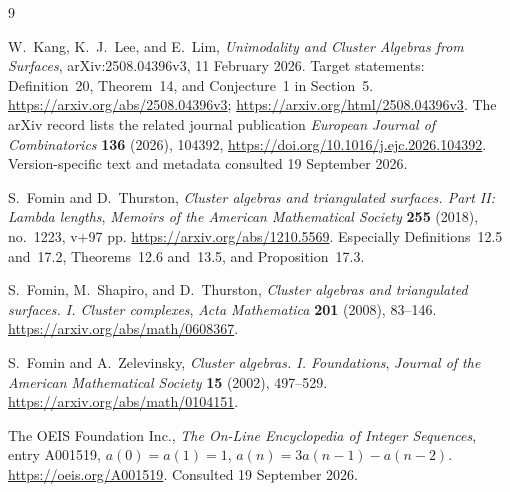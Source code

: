 \documentclass[11pt,letterpaper]{article}
\numberwithin{equation}{section}
\theoremstyle{definition}
\begin{document}
\begin{thebibliography}{9}

W.~Kang, K.~J.~Lee, and E.~Lim,
\emph{Unimodality and Cluster Algebras from Surfaces},
arXiv:2508.04396v3, 11 February 2026.
Target statements: Definition~20, Theorem~14, and Conjecture~1 in Section~5.
\url{https://arxiv.org/abs/2508.04396v3};
\url{https://arxiv.org/html/2508.04396v3}.
The arXiv record lists the related journal publication
\emph{European Journal of Combinatorics} \textbf{136} (2026), 104392,
\url{https://doi.org/10.1016/j.ejc.2026.104392}.
Version-specific text and metadata consulted 19 September 2026.

S.~Fomin and D.~Thurston,
\emph{Cluster algebras and triangulated surfaces. Part II: Lambda lengths},
\emph{Memoirs of the American Mathematical Society} \textbf{255} (2018),
no.~1223, v+97 pp.
\url{https://arxiv.org/abs/1210.5569}.
Especially Definitions~12.5 and~17.2, Theorems~12.6 and~13.5,
and Proposition~17.3.

S.~Fomin, M.~Shapiro, and D.~Thurston,
\emph{Cluster algebras and triangulated surfaces. I. Cluster complexes},
\emph{Acta Mathematica} \textbf{201} (2008), 83--146.
\url{https://arxiv.org/abs/math/0608367}.

S.~Fomin and A.~Zelevinsky,
\emph{Cluster algebras. I. Foundations},
\emph{Journal of the American Mathematical Society} \textbf{15} (2002),
497--529.
\url{https://arxiv.org/abs/math/0104151}.

The OEIS Foundation Inc.,
\emph{The On-Line Encyclopedia of Integer Sequences}, entry A001519,
$a(0)=a(1)=1$, $a(n)=3a(n-1)-a(n-2)$.
\url{https://oeis.org/A001519}.
Consulted 19 September 2026.

\end{thebibliography}
\end{document}
